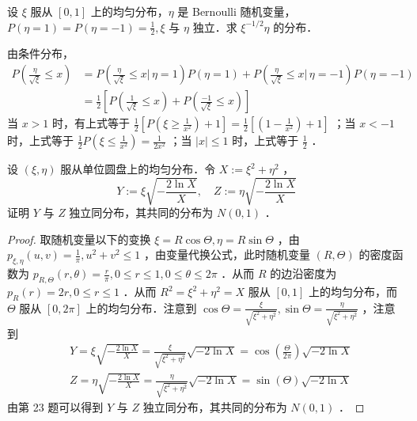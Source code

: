 \begin{exercise}
    设 $\xi$ 服从 $[0,1]$ 上的均匀分布，$\eta$ 是 Bernoulli 随机变量，$P(\eta=1)=P(\eta=-1)=\frac{1}{2}, \xi$ 与 $\eta$ 独立．求 $\xi^{-1 / 2} \eta$ 的分布．
\end{exercise}
\begin{solution}
    由条件分布，
    $$
        \begin{aligned}
            P\left(\frac{\eta}{\sqrt{\xi}} \leq x\right) & =P\left(\frac{\eta}{\sqrt{\xi}} \leq x |\, \eta=1\right) P(\eta=1)+P\left(\frac{\eta}{\sqrt{\xi}} \leq x |\, \eta=-1\right) P(\eta=-1) \\
                                                         & =\frac{1}{2}\left[P\left(\frac{1}{\sqrt{\xi}} \leq x\right)+P\left(\frac{-1}{\sqrt{\xi}} \leq x\right)\right]
        \end{aligned}
    $$
    当 $x>1$ 时，有上式等于 $\frac{1}{2}\left[P\left(\xi \geq \frac{1}{x^2}\right)+1\right]=\frac{1}{2}\left[\left(1-\frac{1}{x^2}\right)+1\right]$ ；当 $x<-1$ 时，上式等于 $\frac{1}{2} P\left(\xi \leq \frac{1}{x^2}\right)=\frac{1}{2 x^2}$ ；当 $|x| \leq 1$ 时，上式等于 $\frac{1}{2}$ ．
\end{solution}

\begin{exercise}
    设 $(\xi, \eta)$ 服从单位圆盘上的均匀分布．令 $X:=\xi^2+\eta^2$ ，
    $$
        Y:=\xi \sqrt{-\frac{2 \ln X}{X}}, \quad Z:=\eta \sqrt{-\frac{2 \ln X}{X}}
    $$
    证明 $Y$ 与 $Z$ 独立同分布，其共同的分布为 $N(0,1)$ ．
\end{exercise}
\begin{proof}
    取随机变量以下的变换 $\xi=R \cos \Theta, \eta=R \sin \Theta$ ，由 $p_{\xi, \eta}(u, v)=\frac{1}{\pi}, u^2+v^2 \leq 1$ ，由变量代换公式，此时随机变量 $(R, \Theta)$ 的密度函数为 $p_{R, \Theta}(r, \theta)=\frac{r}{\pi}, 0 \leq r \leq 1,0 \leq \theta \leq 2 \pi$ ．从而 $R$ 的边沿密度为 $p_R(r)=2 r, 0 \leq r \leq 1$ ．从而 $R^2=\xi^2+\eta^2=X$ 服从 $[0,1]$ 上的均匀分布，而 $\Theta$ 服从 $[0,2 \pi]$ 上的均匀分布．注意到 $\cos \Theta=\frac{\xi}{\sqrt{\xi^2+\eta^2}}, \sin \Theta=\frac{\eta}{\sqrt{\xi^2+\eta^2}}$ ，注意到
    $$
        \begin{aligned}
             & Y=\xi \sqrt{-\frac{2 \ln X}{X}}=\frac{\xi}{\sqrt{\xi^2+\eta^2}} \sqrt{-2 \ln X}=\cos \left( \frac{\Theta}{2 \pi}\right) \sqrt{-2 \ln X}   \\
             & Z=\eta \sqrt{-\frac{2 \ln X}{X}}=\frac{\eta}{\sqrt{\xi^2+\eta^2}} \sqrt{-2 \ln X}=\sin \left( \Theta\right) \sqrt{-2 \ln X}
        \end{aligned}
    $$
    由第 23 题可以得到 $Y$ 与 $Z$ 独立同分布，其共同的分布为 $N(0,1)$ ．
\end{proof}

